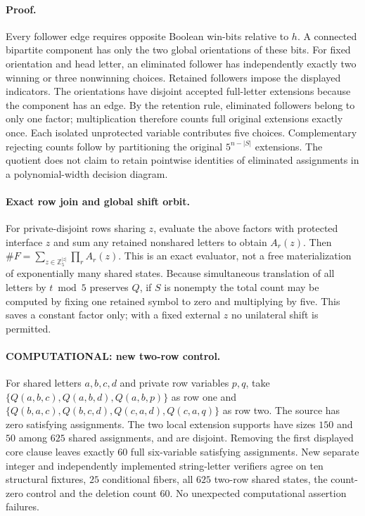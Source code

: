 \documentclass[11pt]{article}
\begin{document}
\paragraph{Proof.}
Every follower edge requires opposite Boolean win-bits relative to $h$.
A connected bipartite component has only the two global orientations of
these bits. For fixed orientation and head letter, an eliminated follower
has independently exactly two winning or three nonwinning choices.
Retained followers impose the displayed indicators. The orientations
have disjoint accepted full-letter extensions because the component
has an edge. By the retention rule, eliminated followers belong to
only one factor; multiplication therefore counts full original
extensions exactly once. Each isolated unprotected variable contributes
five choices. Complementary rejecting counts follow by partitioning
the original $5^{n-|S|}$ extensions. The quotient does not claim to
retain pointwise identities of eliminated assignments in a
polynomial-width decision diagram.

\paragraph{Exact row join and global shift orbit.}
For private-disjoint rows sharing $z$, evaluate the above factors
with protected interface $z$ and sum any retained nonshared letters to
obtain $A_r(z)$. Then
$\#F=\sum_{z\in\mathbb Z_5^{|z|}}\prod_r A_r(z)$.
This is an exact evaluator, not a free materialization of exponentially
many shared states. Because simultaneous translation of all letters
by $t\bmod 5$ preserves $Q$, if $S$ is nonempty the total count may
be computed by fixing one retained symbol to zero and multiplying by
five. This saves a constant factor only; with a fixed external $z$ no
unilateral shift is permitted.

\paragraph{COMPUTATIONAL: new two-row control.}
For shared letters $a,b,c,d$ and private row variables $p,q$, take
$\{Q(a,b,c),Q(a,b,d),Q(a,b,p)\}$ as row one and
$\{Q(b,a,c),Q(b,c,d),Q(c,a,d),Q(c,a,q)\}$ as row two.
The source has zero satisfying assignments. The two local extension
supports have sizes $150$ and $50$ among $625$ shared assignments,
and are disjoint. Removing the first displayed core clause leaves
exactly $60$ full six-variable satisfying assignments.
New separate integer and independently implemented string-letter
verifiers agree on ten structural fixtures, $25$ conditional fibers,
all $625$ two-row shared states, the count-zero control and the
deletion count $60$. No unexpected computational assertion failures.
\end{document}
